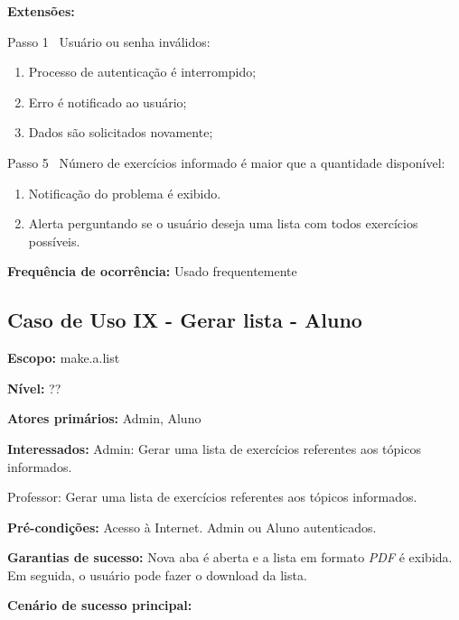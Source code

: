 \documentclass[12pt,oneside,a4paper,article]{abntex2}
\begin{document}
			\textbf{Extensões:} 
			
			Passo 1 \textrightarrow \ Usuário ou senha inválidos:
			
			\begin{enumerate}[label=\alph*.]	
				\item Processo de autenticação é interrompido;
				\item Erro é notificado ao usuário;
				\item Dados são solicitados novamente;
			\end{enumerate}
			
			Passo 5 \textrightarrow \ Número de exercícios informado é maior que a quantidade disponível:
			
			\begin{enumerate}[label=\alph*.]	
				\item Notificação do problema é exibido.
				\item Alerta perguntando se o usuário deseja uma lista com todos exercícios possíveis.
			\end{enumerate}
			
			\textbf{Frequência de ocorrência:} Usado frequentemente
			
	
		\subsection{Caso de Uso IX - Gerar lista - Aluno}
		
		
		\textbf{Escopo:} make.a.list 
		
		\textbf{Nível:} ??
		
		\textbf{Atores primários:} Admin, Aluno
		
		\textbf{Interessados:} Admin: Gerar uma lista de exercícios referentes aos tópicos informados.
		
		Professor: Gerar uma lista de exercícios referentes aos tópicos informados.
		
		\textbf{Pré-condições:} Acesso à Internet. Admin ou Aluno autenticados.
		
		\textbf{Garantias de sucesso:} Nova aba é aberta e a lista em formato \textit{PDF} é exibida. Em seguida, o usuário pode fazer o download da lista.
		
		\textbf{Cenário de sucesso principal:} 
		
\end{document}
